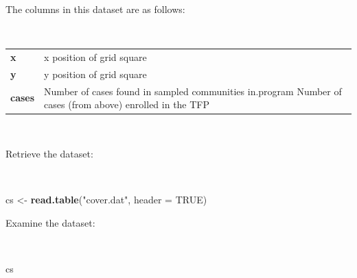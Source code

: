 \documentclass[12pt,a4paper]{book}
\newenvironment{Shaded}{\begin{snugshade}}{\end{snugshade}}
\newcommand{\DataTypeTok}[1]{\textcolor[rgb]{0.13,0.29,0.53}{#1}}
\newcommand{\KeywordTok}[1]{\textcolor[rgb]{0.13,0.29,0.53}{\textbf{#1}}}
\newcommand{\NormalTok}[1]{#1}
\newcommand{\OtherTok}[1]{\textcolor[rgb]{0.56,0.35,0.01}{#1}}
\newcommand{\StringTok}[1]{\textcolor[rgb]{0.31,0.60,0.02}{#1}}
\theoremstyle{definition}
\theoremstyle{definition}
\theoremstyle{definition}
\theoremstyle{remark}
\begin{document}
The columns in this dataset are as follows:

~

\begin{longtable}[]{@{}ll@{}}
\toprule
\endhead
\begin{minipage}[t]{0.09\columnwidth}\raggedright
\textbf{x}\strut
\end{minipage} & \begin{minipage}[t]{0.85\columnwidth}\raggedright
x position of grid square\strut
\end{minipage}\tabularnewline
\begin{minipage}[t]{0.09\columnwidth}\raggedright
\textbf{y}\strut
\end{minipage} & \begin{minipage}[t]{0.85\columnwidth}\raggedright
y position of grid square\strut
\end{minipage}\tabularnewline
\begin{minipage}[t]{0.09\columnwidth}\raggedright
\textbf{cases}\strut
\end{minipage} & \begin{minipage}[t]{0.85\columnwidth}\raggedright
Number of cases found in sampled communities in.program Number of cases
(from above) enrolled in the TFP\strut
\end{minipage}\tabularnewline
\bottomrule
\end{longtable}

~

Retrieve the dataset:

~

\begin{Shaded}
\begin{Highlighting}[]
\NormalTok{cs <-}\StringTok{ }\KeywordTok{read.table}\NormalTok{(}\StringTok{"cover.dat"}\NormalTok{, }\DataTypeTok{header =} \OtherTok{TRUE}\NormalTok{)}
\end{Highlighting}
\end{Shaded}

\newpage

Examine the dataset:

~

\begin{Shaded}
\begin{Highlighting}[]
\NormalTok{cs}
\end{Highlighting}
\end{Shaded}
\end{document}
